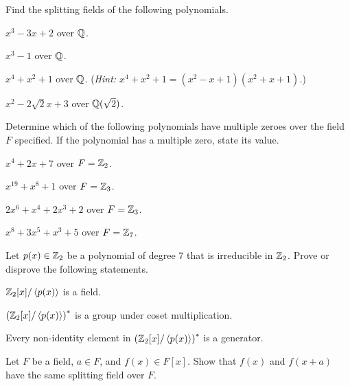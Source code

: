 \begin{problem}
    Find the splitting fields of the following polynomials.
    \begin{partquestions}{\alph*}
        \item $x^3 - 3x + 2$ over $\mathbb{Q}$.
        \item $x^3 - 1$ over $\mathbb{Q}$.
        \item $x^4 + x^2 + 1$ over $\mathbb{Q}$.\newline
        (\textit{Hint: $x^4+x^2+1 = (x^2-x+1)(x^2+x+1)$.})
        \item $x^2 - 2\sqrt{2}x + 3$ over $\mathbb{Q}(\sqrt2)$.
    \end{partquestions}
\end{problem}

\begin{problem}
    Determine which of the following polynomials have multiple zeroes over the field $F$ specified. If the polynomial has a multiple zero, state its value.
    \begin{partquestions}{\alph*}
        \item $x^4 + 2x + 7$ over $F = \mathbb{Z}_2$.
        \item $x^{19} + x^8 + 1$ over $F = \mathbb{Z}_3$.
        \item $2x^6 + x^4 + 2x^3 + 2$ over $F = \mathbb{Z}_3$.
        \item $x^8 + 3x^5 + x^3 + 5$ over $F = \mathbb{Z}_7$.
    \end{partquestions}
\end{problem}

\begin{problem}
    Let $p(x) \in \mathbb{Z}_2$ be a polynomial of degree 7 that is irreducible in $\mathbb{Z}_2$. Prove or disprove the following statements.
    \begin{partquestions}{\roman*}
        \item $\mathbb{Z}_2[x]/\left\langle p(x)\right\rangle$ is a field.
        \item $\left(\mathbb{Z}_2[x]/\left\langle p(x)\right\rangle\right)^\ast$ is a group under coset multiplication.
        \item Every non-identity element in $\left(\mathbb{Z}_2[x]/\left\langle p(x)\right\rangle\right)^\ast$ is a generator.
    \end{partquestions}
\end{problem}

\begin{problem}
    Let $F$ be a field, $a \in F$, and $f(x) \in F[x]$. Show that $f(x)$ and $f(x+a)$ have the same splitting field over $F$.
\end{problem}

